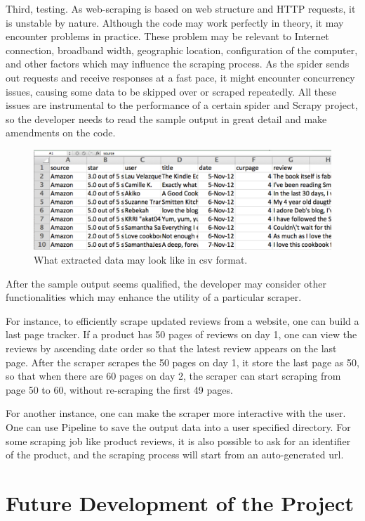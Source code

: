 \documentclass[12pt]{report}
\begin{document}
Third, testing. As web-scraping is based on web structure and HTTP requests, it is unstable by nature. Although the code may work perfectly in theory, it may encounter problems in practice. These problem may be relevant to Internet connection, broadband width, geographic location, configuration of the computer, and other factors which may influence the scraping process. As the spider sends out requests and receive responses at a fast pace, it might encounter concurrency issues, causing some data to be skipped over or scraped repeatedly. All these issues are instrumental to the performance of a certain spider and Scrapy project, so the developer needs to read the sample output in great detail and make amendments on the code.
\begin{figure}[htp]
\includegraphics[width=\textwidth]{sample_output.png}
\caption[Sample csv output]
{What extracted data may look like in csv format.}
\end{figure}

After the sample output seems qualified, the developer may consider other functionalities which may enhance the utility of a particular scraper. 

For instance, to efficiently scrape updated reviews from a website, one can build a last page tracker. If a product has 50 pages of reviews on day 1, one can view the reviews by ascending date order so that the latest review appears on the last page. After the scraper scrapes the 50 pages on day 1, it store the last page as 50, so that when there are 60 pages on day 2, the scraper can start scraping from page 50 to 60, without re-scraping the first 49 pages.

For another instance, one can make the scraper more interactive with the user. One can use Pipeline to save the output data into a user specified directory. For some scraping job like product reviews, it is also possible to ask for an identifier of the product, and the scraping process will start from an auto-generated url.

\chapter{Future Development of the Project}
\end{document}
